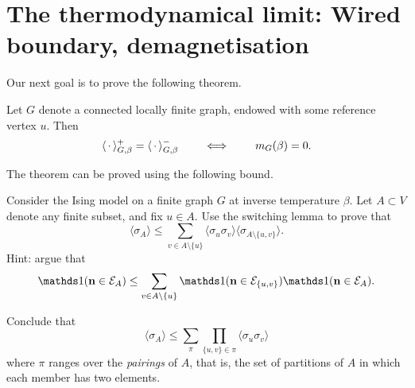 \section{The thermodynamical limit: Wired boundary, demagnetisation}
\label{sec:vanishing_magnetisation}

Our next goal is to prove the following theorem.

\begin{theorem} 
    \label{thm:vanishing_magnetisation}
    Let $G$ denote a connected locally finite graph,
    endowed with some reference vertex $u$.
    Then 
    \[
        \langle\,\cdot\,\rangle_{G,\beta}^+=\langle\,\cdot\,\rangle_{G,\beta}^-
        \qquad
        \iff 
        \qquad
        m_G(\beta)=0.
    \]
\end{theorem}

The theorem can be proved using the following bound.

\begin{exercise}
    Consider the Ising model on a finite graph $G$ at inverse temperature $\beta$.
    Let $A\subset V$ denote any finite subset,
    and fix $u\in A$.
    Use the switching lemma to prove that
    \[
        \langle\sigma_A\rangle \leq
        \sum_{v\in A\setminus\{u\}}
        \langle\sigma_u\sigma_v\rangle
        \langle\sigma_{A\setminus\{u,v\}}\rangle.
    \]
    Hint: argue that
    \[
        \true{\n\in\calE_A}
        \leq
        \sum_{v\in A\setminus\{u\}}
        \true{\n\in\calE_{\{u,v\}}}
        \true{\n\in\calE_A}.
    \]

    Conclude that
    \[
        \langle\sigma_A\rangle \leq
        \sum_{\pi}
        \prod_{\{u,v\}\in \pi}
        \langle\sigma_u\sigma_v\rangle
    \]
    where $\pi$ ranges over the \emph{pairings} of $A$,
    that is, the set of partitions of $A$ in which each member has two elements.
\end{exercise}


